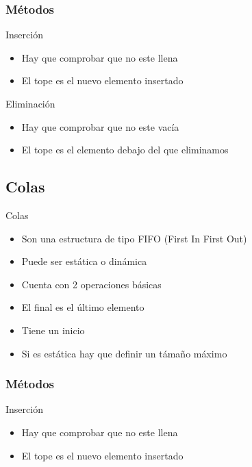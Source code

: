 \documentclass{beamer}
\begin{document}
\subsubsection{M\'etodos}

\begin{frame}{Inserci\'on}
	\begin{itemize}
		\item Hay que comprobar que no este llena
		\item El tope es el nuevo elemento insertado
	\end{itemize}
\end{frame}

\begin{frame}{Eliminaci\'on}
	\begin{itemize}
		\item Hay que comprobar que no este vac\'ia
		\item El tope es el elemento debajo del que eliminamos
	\end{itemize}
\end{frame}

\subsection{Colas}

\begin{frame}{Colas}
	\begin{itemize}
		\item Son una estructura de tipo FIFO (First In First Out)
		\item Puede ser est\'atica o din\'amica
		\item Cuenta con 2 operaciones b\'asicas
		\item El final es el \'ultimo elemento
		\item Tiene un inicio
		\item Si es est\'atica hay que definir un t\'amaño m\'aximo
	\end{itemize}
\end{frame}

\subsubsection{M\'etodos}

\begin{frame}{Inserci\'on}
	\begin{itemize}
		\item Hay que comprobar que no este llena
		\item El tope es el nuevo elemento insertado
	\end{itemize}
\end{frame}
\end{document}
